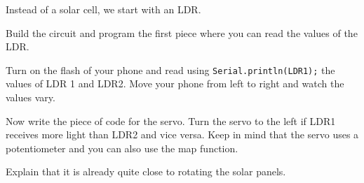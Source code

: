 \documentclass{arduino}
\begin{document}
\newpage

Instead of a solar cell, we start with an LDR.

\begin{alphalist}
\item Build the circuit and program the first piece where you can read the values ​​of the LDR.

\item Turn on the flash of your phone and read using \lstinline{Serial.println(LDR1);} the values ​​of LDR 1 and LDR2. Move your phone from left to right and watch the values ​​vary.

\item Now write the piece of code for the servo. Turn the servo to the left if LDR1 receives more light than LDR2 and vice versa. Keep in mind that the servo uses a potentiometer and you can also use the map function.

\item Explain that it is already quite close to rotating the solar panels.
\end{alphalist}
\end{document}
